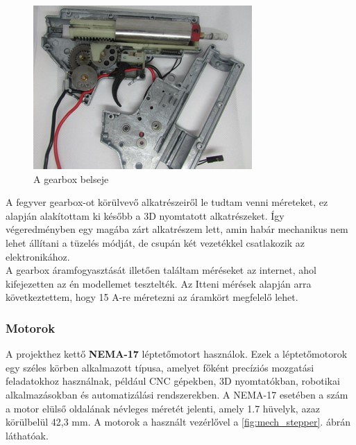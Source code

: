 \documentclass[12pt,a4paper]{article}
\begin{document}
\begin{figure}[h!]
	\centering
	\includegraphics[width=0.6\linewidth]{gearboxbele}
	\caption{A gearbox belseje}
	\label{fig:gearboxbele}
\end{figure}

A fegyver gearbox-ot körülvevő alkatrészeiről le tudtam venni méreteket, ez alapján alakítottam ki később a 3D nyomtatott alkatrészeket. Így végeredményben egy magába zárt alkatrészem lett, amin habár mechanikus nem lehet állítani a tüzelés módját, de csupán két vezetékkel csatlakozik az elektronikához. \\

A gearbox áramfogyasztását illetően találtam méréseket az internet, ahol kifejezetten az én modellemet tesztelték. Az Itteni mérések alapján arra következtettem, hogy 15 A-re méretezni az áramkört megfelelő lehet. \cite{aisroftteszt}

\subsubsection*{Motorok}

A projekthez kettő \textbf{NEMA-17} léptetőmotort használok\cite{nema17}. Ezek a léptetőmotorok egy széles körben alkalmazott típusa, amelyet főként precíziós mozgatási feladatokhoz használnak, például CNC gépekben, 3D nyomtatókban, robotikai alkalmazásokban és automatizálási rendszerekben. A NEMA-17 esetében a szám a motor elülső oldalának névleges méretét jelenti, amely 1.7 hüvelyk, azaz körülbelül 42,3 mm. A motorok a használt vezérlővel a \ref{fig:mech_stepper}. ábrán láthatóak.\\
\end{document}
